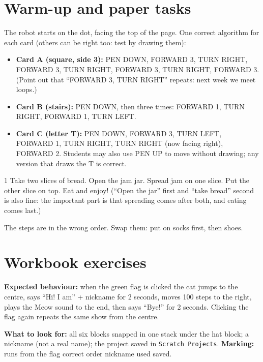 
\section{Warm-up and paper tasks}
\begin{answer}
The robot starts on the dot, facing the top of the page. One correct algorithm for each card (others can be right too: test by drawing them):
\begin{itemize}[leftmargin=1.2em,itemsep=1pt]
  \item \textbf{Card A (square, side 3):} PEN DOWN, FORWARD 3, TURN RIGHT, FORWARD 3, TURN RIGHT, FORWARD 3, TURN RIGHT, FORWARD 3. (Point out that \enquote{FORWARD 3, TURN RIGHT} repeats: next week we meet loops.)
  \item \textbf{Card B (stairs):} PEN DOWN, then three times: FORWARD 1, TURN RIGHT, FORWARD 1, TURN LEFT.
  \item \textbf{Card C (letter T):} PEN DOWN, FORWARD 3, TURN LEFT, FORWARD 1, TURN RIGHT, TURN RIGHT (now facing right), FORWARD 2. Students may also use PEN UP to move without drawing; any version that draws the T is correct.
\end{itemize}
\end{answer}

\begin{answer}
1 Take two slices of bread.  Open the jam jar.  Spread jam on one slice.  Put the other slice on top.  Eat and enjoy!
(\enquote{Open the jar} first and \enquote{take bread} second is also fine: the important part is that spreading comes after both, and eating comes last.)
\end{answer}

\begin{answer}
The steps are in the wrong order. Swap them: put on socks first, then shoes.
\end{answer}

\section{Workbook exercises}
\begin{answer}
\textbf{Expected behaviour:} when the green flag is clicked the cat jumps to the centre, says \enquote{Hi! I am} + nickname for 2 seconds, moves 100 steps to the right, plays the Meow sound to the end, then says \enquote{Bye!} for 2 seconds. Clicking the flag again repeats the same show from the centre.

\textbf{What to look for:} all six blocks snapped in one stack under the hat block; a nickname (not a real name); the project saved in \texttt{Scratch Projects}.
\textbf{Marking:} \tickbox{} runs from the flag \quad \tickbox{} correct order \quad \tickbox{} nickname used \quad \tickbox{} saved.
\end{answer}


